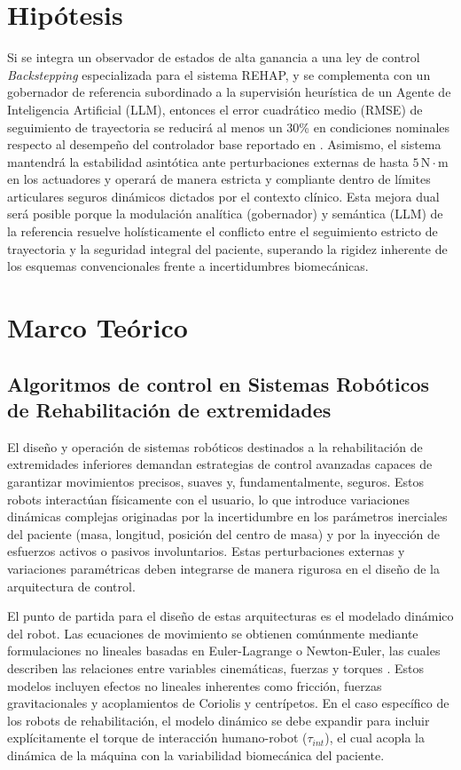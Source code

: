 \documentclass[a4paper,12pt]{article}
\begin{document}
\section{Hipótesis}
Si se integra un observador de estados de alta ganancia a una ley de control \textit{Backstepping} especializada para el sistema REHAP, y se complementa con un gobernador de referencia subordinado a la supervisión heurística de un Agente de Inteligencia Artificial (LLM), entonces el error cuadrático medio (RMSE) de seguimiento de trayectoria se reducirá al menos un 30\% en condiciones nominales respecto al desempeño del controlador base reportado en \citep{reyes2025comparative}. Asimismo, el sistema mantendrá la estabilidad asintótica ante perturbaciones externas de hasta $5\,\mathrm{N{\cdot}m}$ en los actuadores y operará de manera estricta y compliante dentro de límites articulares seguros dinámicos dictados por el contexto clínico. Esta mejora dual será posible porque la modulación analítica (gobernador) y semántica (LLM) de la referencia resuelve holísticamente el conflicto entre el seguimiento estricto de trayectoria y la seguridad integral del paciente, superando la rigidez inherente de los esquemas convencionales frente a incertidumbres biomecánicas.

\newpage


\section{Marco Teórico}
\subsection{Algoritmos de control en Sistemas Robóticos de Rehabilitación de extremidades}

El diseño y operación de sistemas robóticos destinados a la rehabilitación de extremidades inferiores demandan estrategias de control avanzadas capaces de garantizar movimientos precisos, suaves y, fundamentalmente, seguros. Estos robots interactúan físicamente con el usuario, lo que introduce variaciones dinámicas complejas originadas por la incertidumbre en los parámetros inerciales del paciente (masa, longitud, posición del centro de masa) y por la inyección de esfuerzos activos o pasivos involuntarios. Estas perturbaciones externas y variaciones paramétricas deben integrarse de manera rigurosa en el diseño de la arquitectura de control.

El punto de partida para el diseño de estas arquitecturas es el modelado dinámico del robot. Las ecuaciones de movimiento se obtienen comúnmente mediante formulaciones no lineales basadas en Euler-Lagrange o Newton-Euler, las cuales describen las relaciones entre variables cinemáticas, fuerzas y torques \citep{spong2006robot, siciliano2010robotics}. Estos modelos incluyen efectos no lineales inherentes como fricción, fuerzas gravitacionales y acoplamientos de Coriolis y centrípetos. En el caso específico de los robots de rehabilitación, el modelo dinámico se debe expandir para incluir explícitamente el torque de interacción humano-robot ($\tau_{int}$), el cual acopla la dinámica de la máquina con la variabilidad biomecánica del paciente.
\end{document}

